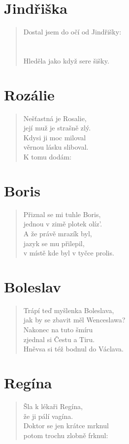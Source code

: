 \section*{Jindřiška}
\begin{verse}
Dostal jsem do očí od Jindřišky:\\
\\
\\
Hleděla jako když sere šišky.
\end{verse}

\section*{Rozálie}
\begin{verse}
Nešťastná je Rosalie,\\
její muž je strašně zlý.\\
Kdysi ji moc miloval\\
věrnou lásku sliboval.\\
K tomu dodám: 
\end{verse}

\section*{Boris}
\begin{verse}
Přiznal se mi tuhle Boris,\\
jednou v zimě plotek olíz'.\\
A že právě mrazík byl,\\
jazyk se mu přilepil,\\
v místě kde byl v tyčce prolis.
\end{verse}

\section*{Boleslav}
\begin{verse}
Trápí teď myšlenka Boleslava,\\
jak by se zbavit měl Wenceslawa?\\
Nakonec na tuto šmíru\\
zjednal si Čestu a Tiru.\\
Hněvsa si též bodnul do Václava.
\end{verse}

\section*{Regína}
\begin{verse}
Šla k lékaři Regína,\\
že ji pálí vagína.\\
Doktor se jen krátce mrknul\\
potom trochu zlobně frknul:\\
\end{verse}

